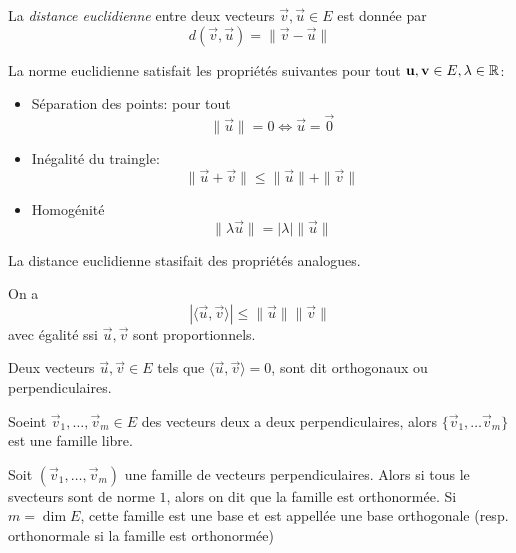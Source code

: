 \begin{definition}
	La \emph{distance euclidienne} entre deux vecteurs $\vec{v}, \vec{u} \in E$
	est donnée par
	\begin{equation*}
		d(\vec{v}, \vec{u}) = \|\vec{v}-\vec{u}\|
	\end{equation*}
\end{definition}

\begin{theorem}
	La norme euclidienne satisfait les propriétés suivantes
	pour tout $\mathbf{u}, \mathbf{v} \in E, \lambda \in \mathbb{R}$:
	\begin{itemize}
		\item Séparation des points: pour tout
			\begin{equation*}
				\|\vec{u}\| = 0 \iff \vec{u} = \vec{0}
			\end{equation*}
		\item Inégalité du traingle:
			\begin{equation*}
				\|\vec{u} + \vec{v}\| \leq \|\vec{u}\| + \|\vec{v}\|
			\end{equation*}
		\item Homogénité
			\begin{equation*}
				\|\lambda\vec{u}\| = |\lambda|\|\vec{u}\|
			\end{equation*}
	\end{itemize}
	La distance euclidienne stasifait des propriétés analogues.
\end{theorem}

\begin{proposition}
	On a 
	\begin{equation*}
		|\langle \vec{u}, \vec{v}\rangle| \leq \|\vec{u}\|\|\vec{v}\|
	\end{equation*}
	avec égalité ssi $\vec{u}, \vec{v}$ sont proportionnels.
\end{proposition}

\begin{definition}
	Deux vecteurs $\vec{u}, \vec{v} \in E$ tels que $\langle \vec{u}, \vec{v}
	\rangle = 0$, sont dit orthogonaux ou perpendiculaires.
\end{definition}

\begin{proposition}
	Soeint $\vec{v}_1, \dots, \vec{v}_m \in E$ des vecteurs deux a deux
	perpendiculaires, alors $\{\vec{v}_1, \dots \vec{v}_m\}$ est une famille
	libre.
\end{proposition}

\begin{definition}
	Soit $(\vec{v}_1, \dots, \vec{v}_m)$ une famille de vecteurs
	perpendiculaires. Alors si tous le svecteurs sont de norme $1$, alors on dit
	que la famille est orthonormée. Si $m = \dim E$, cette famille est une base
	et est appellée une base orthogonale (resp. orthonormale si la famille est
	orthonormée)
\end{definition}

